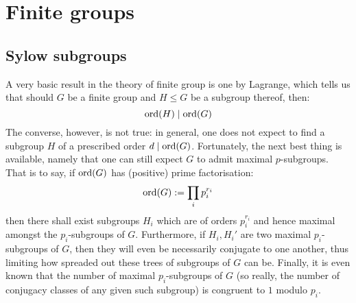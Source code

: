 \section{Finite groups}
    \subsection{Sylow subgroups}
        A very basic result in the theory of finite group is one by Lagrange, which tells us that should $G$ be a finite group and $H \leq G$ be a subgroup thereof, then:
            $$\operatorname{ord}(H) \mid \operatorname{ord}(G)$$
        The converse, however, is not true: in general, one does not expect to find a subgroup $H$ of a prescribed order $d \mid \operatorname{ord}(G)$. Fortunately, the next best thing is available, namely that one can still expect $G$ to admit maximal $p$-subgroups. That is to say, if $\operatorname{ord}(G)$ has (positive) prime factorisation:
            $$\operatorname{ord}(G) := \prod_i p_i^{r_i}$$
        then there shall exist subgroups $H_i$ which are of orders $p_i^{r_i}$ and hence maximal amongst the $p_i$-subgroups of $G$. Furthermore, if $H_i, H_i'$ are two maximal $p_i$-subgroups of $G$, then they will even be necessarily conjugate to one another, thus limiting how spreaded out these trees of subgroups of $G$ can be. Finally, it is even known that the number of maximal $p_i$-subgroups of $G$ (so really, the number of conjugacy classes of any given such subgroup) is congruent to $1$ modulo $p_i$.


